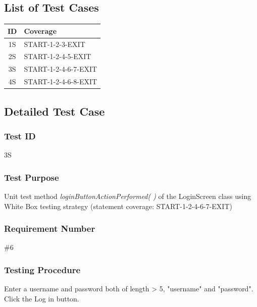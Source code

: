 \documentclass{article}
\begin{document}
\subsection{List of Test Cases}
\begin{center}
  \begin{tabular}{| c | l |}
    \hline
    ID & Coverage\\
    \hline
    1S & START-1-2-3-EXIT\\
    2S & START-1-2-4-5-EXIT\\
    3S & START-1-2-4-6-7-EXIT\\
    4S & START-1-2-4-6-8-EXIT\\
    \hline
  \end{tabular}
\end{center}

\subsection{Detailed Test Case}
\subsubsection{Test ID}
3S

\subsubsection{Test Purpose}
Unit test method \textit{loginButtonActionPerformed( )} of the LoginScreen class using White Box testing strategy (statement coverage: START-1-2-4-6-7-EXIT)

\subsubsection{Requirement Number}

\#6

\subsubsection{Testing Procedure}

Enter a username and password both of length > 5, "username" and "password".  Click the Log in button.
\end{document}
